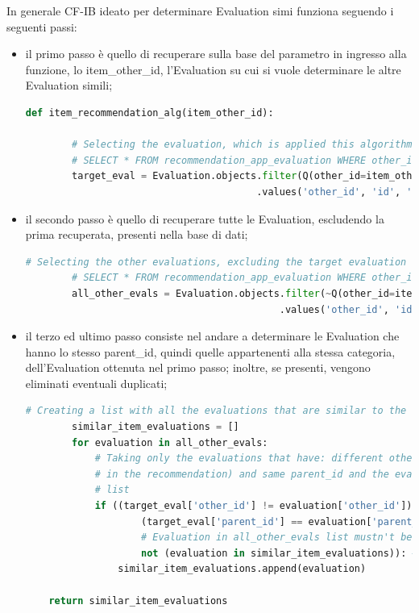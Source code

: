 In generale CF-IB ideato per determinare Evaluation simi funziona seguendo i seguenti passi:
\begin{itemize}
	\item il primo passo è quello di recuperare sulla base del parametro in ingresso alla funzione, lo item\_other\_id,
	l'Evaluation su cui si vuole determinare le altre Evaluation simili;
	\begin{lstlisting}[language=Python, label=lst:CF_IB_Evaluation_1]
	def item_recommendation_alg(item_other_id):

		# Selecting the evaluation, which is applied this algorithm, from its other_id
		# SELECT * FROM recommendation_app_evaluation WHERE other_id = %(item_other_id)s AND node_type = 'eva'
		target_eval = Evaluation.objects.filter(Q(other_id=item_other_id) & Q(node_type="eva"))\
										.values('other_id', 'id', 'parent_id')[0]
	\end{lstlisting} 
	\item il secondo passo è quello di recuperare tutte le Evaluation, escludendo la prima recuperata, presenti nella base di dati;
	\begin{lstlisting}[language=Python, label=lst:CF_IB_Evaluation_2]
		# Selecting the other evaluations, excluding the target evaluation
		# SELECT * FROM recommendation_app_evaluation WHERE other_id != %(item_other_id)s AND node_type = 'eva'
		all_other_evals = Evaluation.objects.filter(~Q(other_id=item_other_id) & Q(node_type="eva"))\
											.values('other_id', 'id', 'parent_id').order_by('other_id')
	\end{lstlisting}
	\item il terzo ed ultimo passo consiste nel andare a determinare le Evaluation che hanno lo stesso parent\_id, quindi
	quelle appartenenti alla stessa categoria, dell'Evaluation ottenuta nel primo passo; inoltre, se presenti, vengono 
	eliminati eventuali duplicati;
	\begin{lstlisting}[language=Python, label=lst:CF_IB_Evaluation_3]
		# Creating a list with all the evaluations that are similar to the target evaluation (comparing the parent_id)
		similar_item_evaluations = []
		for evaluation in all_other_evals:
			# Taking only the evaluations that have: different other_id (excluding the target evaluation
			# in the recommendation) and same parent_id and the evaluations that weren't added to similar_item_evaluations
			# list
			if ((target_eval['other_id'] != evaluation['other_id']) and  # Evaluations must have different 'other_id'
					(target_eval['parent_id'] == evaluation['parent_id']) and  # Evaluations must have same 'parent_id'
					# Evaluation in all_other_evals list mustn't be already added to \
					not (evaluation in similar_item_evaluations)): # the 'similar_item_evaluations' list
				similar_item_evaluations.append(evaluation)

	return similar_item_evaluations	
	\end{lstlisting}
\end{itemize}

